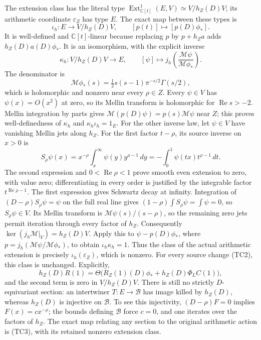 The extension class has the literal type
\(\operatorname{Ext}^1_{\mathbb C[t]}(E,V)\simeq V/h_Z(D)V\);
its arithmetic coordinate \(\varepsilon_Z\) has type \(E\).
The exact map between these types is
\[
 \iota_h:E\longrightarrow V/h_Z(D)V,\qquad
 [p(t)]\longmapsto[p(D)\phi_*].
 \tag{TC10a}
\]
It is well-defined and \(\mathbb C[t]\)-linear because replacing \(p\)
by \(p+h_Za\) adds \(h_Z(D)a(D)\phi_*\).
It is an isomorphism, with the explicit inverse
\[
 \kappa_h:V/h_Z(D)V\longrightarrow E,\qquad
 [\psi]\longmapsto j_h\left(\frac{\mathcal M\psi}
                                  {\mathcal M\phi_*}\right).
 \tag{TC10b}
\]
The denominator is
\[
 \mathcal M\phi_*(s)
   =\tfrac12s(s-1)\pi^{-s/2}\Gamma(s/2),
\]
which is holomorphic and nonzero near every \(\rho\in Z\).
Every \(\psi\in V\) has \(\psi(x)=O(x^2)\) at zero, so its Mellin
transform is holomorphic for \(\operatorname{Re}s>-2\).
Mellin integration by parts gives
\(\mathcal M(p(D)\psi)=p(s)\mathcal M\psi\) near \(Z\);
this proves well-definedness of \(\kappa_h\) and
\(\kappa_h\iota_h=1_E\).
For the other inverse law, let \(\psi\in V\) have vanishing Mellin
jets along \(h_Z\).  For the first factor \(t-\rho\), its source inverse
on \(x>0\) is
\[
 S_\rho\psi(x)
    =x^{-\rho}\int_x^\infty\psi(y)y^{\rho-1}\,dy
    =-\int_0^1\psi(tx)t^{\rho-1}\,dt .
\]
The second expression and \(0<\operatorname{Re}\rho<1\) prove
smooth even extension to zero, with value zero; differentiating in
every order is justified by the integrable factor \(t^{\operatorname{Re}\rho-1}\).
The first expression gives Schwartz decay at infinity.
Integration of \((D-\rho)S_\rho\psi=\psi\) on the full real line gives
\((1-\rho)\int S_\rho\psi=\int\psi=0\), so \(S_\rho\psi\in V\).
Its Mellin transform is \(\mathcal M\psi(s)/(s-\rho)\), so the
remaining zero jets permit iteration through every factor of \(h_Z\).
Consequently \(\ker(j_h\mathcal M|_V)=h_Z(D)V\).
Apply this to \(\psi-p(D)\phi_*\), where
\(p=j_h(\mathcal M\psi/\mathcal M\phi_*)\), to obtain
\(\iota_h\kappa_h=1\).
Thus the class of the actual arithmetic extension is precisely
\(\iota_h(\varepsilon_Z)\), which is nonzero.
For every source change (TC2), this class is unchanged.  Explicitly,
\[
 h_Z(D)R(1)
   =\Theta\bigl(R_Z(1)(D)\phi_*+h_Z(D)\Phi_LC(1)\bigr),
\]
and the second term is zero in \(V/h_Z(D)V\).
There is still no strictly \(D\)-equivariant section:
an intertwiner \(T:E\to\mathscr B\) has image killed by \(h_Z(D)\),
whereas \(h_Z(D)\) is injective on \(\mathscr B\).  To see this
injectivity, \((D-\rho)F=0\) implies \(F(x)=c x^{-\rho}\);
the bounds defining \(\mathscr B\) force \(c=0\), and one iterates
over the factors of \(h_Z\).
The exact map relating any section to the original arithmetic action
is (TC3), with its retained nonzero extension class.

